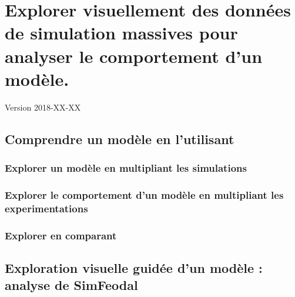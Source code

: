\chapter{Explorer visuellement des données de simulation massives pour analyser le comportement d'un modèle.} 
\begin{center}
	{\large Version 2018-XX-XX}
\end{center}

%
%
%
%
%
%

\section{Comprendre un modèle en l'utilisant}
\subsection{Explorer un modèle en multipliant les simulations}
\subsection{Explorer le comportement d'un modèle en multipliant les experimentations}
\subsection{Explorer en comparant}

\section{Exploration visuelle guidée d'un modèle : analyse de SimFeodal}
